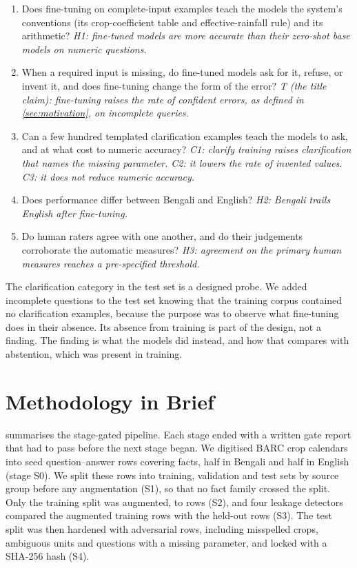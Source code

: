 \begin{enumerate}[label=\textbf{RQ\arabic*.}, leftmargin=*]
  \item Does fine-tuning on complete-input examples teach the models the system's conventions (its crop-coefficient table and effective-rainfall rule) and its arithmetic? \emph{H1: fine-tuned models are more accurate than their zero-shot base models on numeric questions.}
  \item When a required input is missing, do fine-tuned models ask for it, refuse, or invent it, and does fine-tuning change the form of the error? \emph{T (the title claim): fine-tuning raises the rate of confident errors, as defined in \cref{sec:motivation}, on incomplete queries.}
  \item Can a few hundred templated clarification examples teach the models to ask, and at what cost to numeric accuracy? \emph{C1: clarify training raises clarification that names the missing parameter. C2: it lowers the rate of invented values. C3: it does not reduce numeric accuracy.}
  \item Does performance differ between Bengali and English? \emph{H2: Bengali trails English after fine-tuning.}
  \item Do human raters agree with one another, and do their judgements corroborate the automatic measures? \emph{H3: agreement on the primary human measures reaches a pre-specified threshold.}
\end{enumerate}

The clarification category in the test set is a designed probe. We added incomplete questions to the test set knowing that the training corpus contained no clarification examples, because the purpose was to observe what fine-tuning does in their absence. Its absence from training is part of the design, not a finding. The finding is what the models did instead, and how that compares with abstention, which was present in training.

\section{Methodology in Brief}
\label{sec:method-brief}

 summarises the stage-gated pipeline. Each stage ended with a written gate report that had to pass before the next stage began. We digitised \SourceFiles BARC crop calendars into \SeedRows seed question--answer rows covering \SeedFacts facts, half in Bengali and half in English (stage S0). We split these rows into training, validation and test sets by source group before any augmentation (S1), so that no fact family crossed the split. Only the training split was augmented, to \AugRows rows (S2), and four leakage detectors compared the augmented training rows with the held-out rows (S3). The test split was then hardened with \TestRowsAdv adversarial rows, including misspelled crops, ambiguous units and questions with a missing parameter, and locked with a SHA-256 hash (S4).

